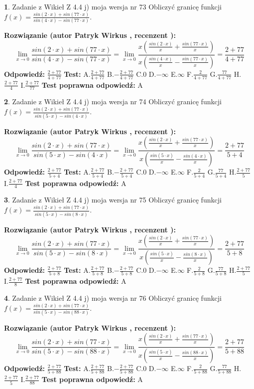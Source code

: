 \documentclass[12pt, a4paper]{article}
\theoremstyle{definition} %
\newtheorem{zad}{}
\newcommand{\zadStart}[1]{\begin{zad}#1\newline}
\newcommand{\zadStop}{\end{zad}}
\newcommand{\rozwStart}[2]{\noindent \textbf{Rozwiązanie (autor #1 , recenzent #2): }\newline}
\newcommand{\rozwStop}{\newline}
\newcommand{\odpStart}{\noindent \textbf{Odpowiedź:}\newline}
\newcommand{\odpStop}{\newline}
\newcommand{\testStart}{\noindent \textbf{Test:}\newline}
\newcommand{\testStop}{\newline}
\newcommand{\kluczStart}{\noindent \textbf{Test poprawna odpowiedź:}\newline}
\newcommand{\kluczStop}{\newline}
\begin{document}
\zadStart{Zadanie z Wikieł Z 4.4 j) moja wersja nr 73}
Obliczyć granicę funkcji $f(x)=\frac{sin(2\cdot x) +sin(77\cdot x)}{sin(4\cdot x) -sin(77\cdot x)}$.
\zadStop
\rozwStart{Patryk Wirkus}{}
$$\lim\limits_{x\to 0}\frac{sin(2\cdot x) +sin(77\cdot x)}{sin(4\cdot x) -sin(77\cdot x)}=\lim\limits_{x\to 0}\frac{x(\frac{sin(2\cdot x)}{x}+\frac{sin(77\cdot x)}{x})}{x(\frac{sin(4\cdot x)}{x}-\frac{sin(77\cdot x)}{x})}=\frac{2+77}{4+77}$$
\rozwStop
\odpStart
$\frac{2+77}{4+77}$
\odpStop
\testStart
A.$\frac{2+77}{4+77}$
B.$-\frac{2+77}{4+77}$
C.$0$
D.$-\infty$
E.$\infty$
F.$\frac{2}{4+77}$
G.$\frac{77}{4+77}$
H.$\frac{2+77}{4}$
I.$\frac{2+77}{77}$
\testStop
\kluczStart
A
\kluczStop



\zadStart{Zadanie z Wikieł Z 4.4 j) moja wersja nr 74}
Obliczyć granicę funkcji $f(x)=\frac{sin(2\cdot x) +sin(77\cdot x)}{sin(5\cdot x) -sin(4\cdot x)}$.
\zadStop
\rozwStart{Patryk Wirkus}{}
$$\lim\limits_{x\to 0}\frac{sin(2\cdot x) +sin(77\cdot x)}{sin(5\cdot x) -sin(4\cdot x)}=\lim\limits_{x\to 0}\frac{x(\frac{sin(2\cdot x)}{x}+\frac{sin(77\cdot x)}{x})}{x(\frac{sin(5\cdot x)}{x}-\frac{sin(4\cdot x)}{x})}=\frac{2+77}{5+4}$$
\rozwStop
\odpStart
$\frac{2+77}{5+4}$
\odpStop
\testStart
A.$\frac{2+77}{5+4}$
B.$-\frac{2+77}{5+4}$
C.$0$
D.$-\infty$
E.$\infty$
F.$\frac{2}{5+4}$
G.$\frac{77}{5+4}$
H.$\frac{2+77}{5}$
I.$\frac{2+77}{4}$
\testStop
\kluczStart
A
\kluczStop



\zadStart{Zadanie z Wikieł Z 4.4 j) moja wersja nr 75}
Obliczyć granicę funkcji $f(x)=\frac{sin(2\cdot x) +sin(77\cdot x)}{sin(5\cdot x) -sin(8\cdot x)}$.
\zadStop
\rozwStart{Patryk Wirkus}{}
$$\lim\limits_{x\to 0}\frac{sin(2\cdot x) +sin(77\cdot x)}{sin(5\cdot x) -sin(8\cdot x)}=\lim\limits_{x\to 0}\frac{x(\frac{sin(2\cdot x)}{x}+\frac{sin(77\cdot x)}{x})}{x(\frac{sin(5\cdot x)}{x}-\frac{sin(8\cdot x)}{x})}=\frac{2+77}{5+8}$$
\rozwStop
\odpStart
$\frac{2+77}{5+8}$
\odpStop
\testStart
A.$\frac{2+77}{5+8}$
B.$-\frac{2+77}{5+8}$
C.$0$
D.$-\infty$
E.$\infty$
F.$\frac{2}{5+8}$
G.$\frac{77}{5+8}$
H.$\frac{2+77}{5}$
I.$\frac{2+77}{8}$
\testStop
\kluczStart
A
\kluczStop



\zadStart{Zadanie z Wikieł Z 4.4 j) moja wersja nr 76}
Obliczyć granicę funkcji $f(x)=\frac{sin(2\cdot x) +sin(77\cdot x)}{sin(5\cdot x) -sin(88\cdot x)}$.
\zadStop
\rozwStart{Patryk Wirkus}{}
$$\lim\limits_{x\to 0}\frac{sin(2\cdot x) +sin(77\cdot x)}{sin(5\cdot x) -sin(88\cdot x)}=\lim\limits_{x\to 0}\frac{x(\frac{sin(2\cdot x)}{x}+\frac{sin(77\cdot x)}{x})}{x(\frac{sin(5\cdot x)}{x}-\frac{sin(88\cdot x)}{x})}=\frac{2+77}{5+88}$$
\rozwStop
\odpStart
$\frac{2+77}{5+88}$
\odpStop
\testStart
A.$\frac{2+77}{5+88}$
B.$-\frac{2+77}{5+88}$
C.$0$
D.$-\infty$
E.$\infty$
F.$\frac{2}{5+88}$
G.$\frac{77}{5+88}$
H.$\frac{2+77}{5}$
I.$\frac{2+77}{88}$
\testStop
\kluczStart
A
\kluczStop
\end{document}
